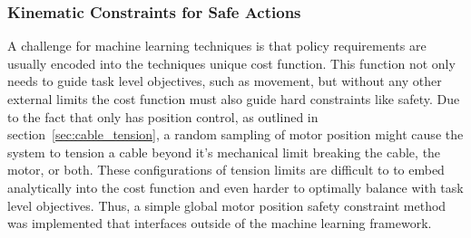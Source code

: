 
\subsubsection{Kinematic Constraints for Safe Actions}

A challenge for machine learning techniques is that policy requirements are usually encoded into the techniques unique cost function.
This function not only needs to guide task level objectives, such as movement, but without any other external limits the cost function must also guide hard constraints like safety.
Due to the fact that \SB{} only has position control, as outlined in section~\ref{sec:cable_tension}, a random sampling of motor position might cause the system to tension a cable beyond it's mechanical limit breaking the cable, the motor, or both.
These configurations of tension limits are difficult to to embed analytically into the cost function and even harder to optimally balance with task level objectives.
Thus, a simple global motor position safety constraint method was implemented that interfaces outside of the machine learning framework.

